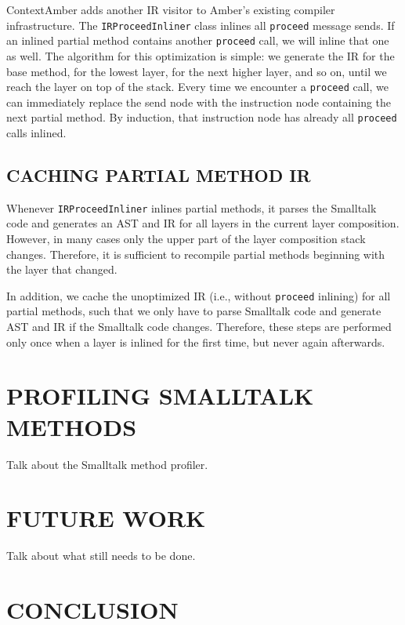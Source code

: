 \documentclass[english,paper=a4,twocolumn=true,DIV=calc,fontsize=9pt]{scrartcl}
\begin{document}
ContextAmber adds another IR visitor to Amber's existing compiler infrastructure. The \texttt{IRProceedInliner} class inlines all \texttt{proceed} message sends. If an inlined partial method contains another \texttt{proceed} call, we will inline that one as well. The algorithm for this optimization is simple: we generate the IR for the base method, for the lowest layer, for the next higher layer, and so on, until we reach the layer on top of the stack. Every time we encounter a \texttt{proceed} call, we can immediately replace the send node with the instruction node containing the next partial method. By induction, that instruction node has already all \texttt{proceed} calls inlined.

\subsection{CACHING PARTIAL METHOD IR}
Whenever \texttt{IRProceedInliner} inlines partial methods, it parses the Smalltalk code and generates an AST and IR for all layers in the current layer composition. However, in many cases only the upper part of the layer composition stack changes. Therefore, it is sufficient to recompile partial methods beginning with the layer that changed.

In addition, we cache the unoptimized IR (i.e., without \texttt{proceed} inlining) for all partial methods, such that we only have to parse Smalltalk code and generate AST and IR if the Smalltalk code changes. Therefore, these steps are performed only once when a layer is inlined for the first time, but never again afterwards.

\section{PROFILING SMALLTALK METHODS}
Talk about the Smalltalk method profiler.

\section{FUTURE WORK}
Talk about what still needs to be done.

\section{CONCLUSION}

{}

\end{document}
